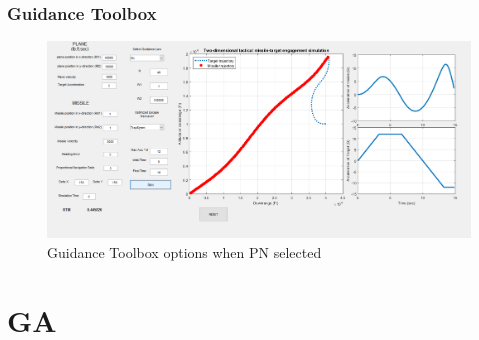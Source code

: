 \documentclass{beamer}
\begin{document}
\begin{frame}
\frametitle{Guidance Toolbox}
\begin{figure}[H]
\centering
\includegraphics[scale = 0.28]{fig/guiPN.PNG}
\caption{Guidance Toolbox options when PN selected}
\label{Guidance Toolbox PN}
\end{figure}
\end{frame}

\section{GA}
\subsection{}
\end{document}
